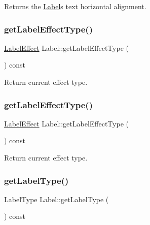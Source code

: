 Returns the \hyperlink{classLabel}{Label}\textquotesingle{}s text horizontal alignment. \mbox{\label{classLabel_a36187b9d07b216314adb4d4f2fad34d2}} 
\subsubsection{\texorpdfstring{get\+Label\+Effect\+Type()}{getLabelEffectType()}\hspace{0.1cm}{\footnotesize\ttfamily [1/2]}}
{\footnotesize\ttfamily \hyperlink{group__base_ga26fd049ca5303e0cf4435208058f32e4}{Label\+Effect} Label\+::get\+Label\+Effect\+Type (\begin{DoxyParamCaption}{ }\end{DoxyParamCaption}) const\hspace{0.3cm}{\ttfamily [inline]}}

Return current effect type. \mbox{\label{classLabel_a36187b9d07b216314adb4d4f2fad34d2}} 
\subsubsection{\texorpdfstring{get\+Label\+Effect\+Type()}{getLabelEffectType()}\hspace{0.1cm}{\footnotesize\ttfamily [2/2]}}
{\footnotesize\ttfamily \hyperlink{group__base_ga26fd049ca5303e0cf4435208058f32e4}{Label\+Effect} Label\+::get\+Label\+Effect\+Type (\begin{DoxyParamCaption}{ }\end{DoxyParamCaption}) const\hspace{0.3cm}{\ttfamily [inline]}}

Return current effect type. \mbox{\label{classLabel_a4bcb53b50d92e4cb056c2c5b4a59bbfd}} 
\subsubsection{\texorpdfstring{get\+Label\+Type()}{getLabelType()}}
{\footnotesize\ttfamily Label\+Type Label\+::get\+Label\+Type (\begin{DoxyParamCaption}{ }\end{DoxyParamCaption}) const\hspace{0.3cm}{\ttfamily [inline]}}

